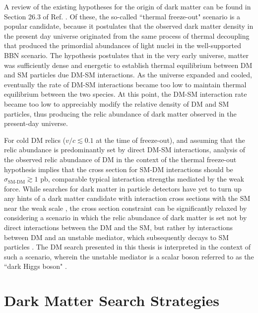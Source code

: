A review of the existing hypotheses for the origin of dark matter can be found in Section 26.3 of Ref. \cite{pdg_2018}. Of these, the so-called ``thermal freeze-out" scenario is a popular candidate, because it postulates that the observed dark matter density in the present day universe originated from the same process of thermal decoupling that produced the primordial abundances of light nuclei in the well-supported BBN scenario. The hypothesis postulates that in the very early universe, matter was sufficiently dense and energetic to establish thermal equilibrium between DM and SM particles due DM-SM interactions. As the universe expanded and cooled, eventually the rate of DM-SM interactions became too low to maintain thermal equilibrium between the two species. At this point, the DM-SM interaction rate became too low to appreciably modify the relative density of DM and SM particles, thus producing the relic abundance of dark matter observed in the present-day universe. 

For cold DM relics (\(v/c\lesssim0.1\) at the time of freeze-out), and assuming that the relic abundance is predominantly set by direct DM-SM interactions, analysis of the observed relic abundance of DM in the context of the thermal freeze-out hypothesis \cite{dm_xsec_2015} implies that the cross section for SM-DM interactions should be \(\sigma_\text{SM-DM}\gtrsim1\) pb, comparable typical interaction strengths mediated by the weak force. While searches for dark matter in particle detectors have yet to turn up any hints of a dark matter candidate with interaction cross sections with the SM near the weak scale \cite{wimp_searches_2018}, the cross section constraint can be significantly relaxed by considering a scenario in which the relic abundance of dark matter is set not by direct interactions between the DM and the SM, but rather by interactions between DM and an unstable mediator, which subsequently decays to SM particles \cite{secluded_dm_2008}. The DM search presented in this thesis is interpreted in the context of such a scenario, wherein the unstable mediator is a scalar boson referred to as the ``dark Higgs boson" \cite{Duerr_2016,Duerr2017}.

\section{Dark Matter Search Strategies}

